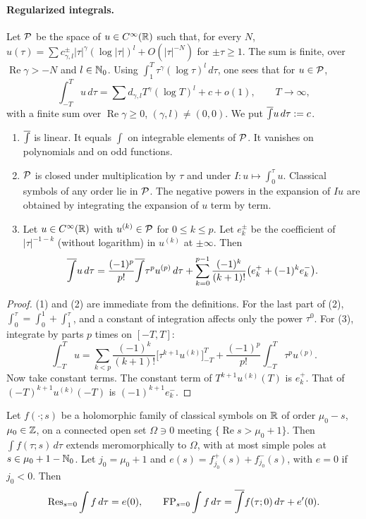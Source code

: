 \paragraph{Regularized integrals.}
Let \(\mathcal P\) be the space of \(u\in C^\infty(\mathbb R)\) such that, for every \(N\),
\(u(\tau)=\sum c^\pm_{\gamma,l}|\tau|^\gamma(\log|\tau|)^l+O(|\tau|^{-N})\)
for \(\pm\tau\ge1\). The sum is finite, over \(\operatorname{Re}\gamma>-N\)
and \(l\in\mathbb N_0\). Using \(\int_1^T\tau^\gamma(\log\tau)^l\,d\tau\), one sees
that for \(u\in\mathcal P\),
\[
 \int_{-T}^Tu\,d\tau=\sum d_{\gamma,l}T^\gamma(\log T)^l+c+o(1),\qquad
 T\to\infty,
\]
with a finite sum over \(\operatorname{Re}\gamma\ge0\), \((\gamma,l)\ne(0,0)\).
We put \(\overline{\int} u\,d\tau:=c\).

\begin{lemma}\label{tr:lem:bint}
\begin{enumerate}
\item \(\overline{\int}\) is linear. It equals \(\int\) on integrable elements of
\(\mathcal P\). It vanishes on polynomials and on odd functions.
\item \(\mathcal P\) is closed under multiplication by \(\tau\) and under
\(I:u\mapsto\int_0^\tau u\). Classical symbols of any order lie in
\(\mathcal P\). The negative powers in the expansion of \(Iu\) are obtained by
integrating the expansion of \(u\) term by term.
\item Let \(u\in C^\infty(\mathbb R)\) with \(u^{(k)}\in\mathcal P\) for \(0\le k\le p\). Let
\(e^\pm_k\) be the coefficient of \(|\tau|^{-1-k}\) (without logarithm) in
\(u^{(k)}\) at \(\pm\infty\). Then
\[
 \overline{\int} u\,d\tau=\frac{(-1)^p}{p!}\overline{\int}\tau^pu^{(p)}\,d\tau+
 \sum_{k=0}^{p-1}\frac{(-1)^k}{(k+1)!}\bigl(e^+_k+(-1)^ke^-_k\bigr).
\]
\end{enumerate}
\end{lemma}

\begin{proof}
(1) and (2) are immediate from the definitions. For the last part of (2),
\(\int_0^\tau=\int_0^1+\int_1^\tau\), and a constant of integration affects
only the power \(\tau^0\). For (3), integrate by parts \(p\) times on
\([-T,T]\):
\[
 \int_{-T}^Tu=\sum_{k<p}\frac{(-1)^k}{(k+1)!}\bigl[\tau^{k+1}u^{(k)}\bigr]_{-T}^T
 +\frac{(-1)^p}{p!}\int_{-T}^T\tau^pu^{(p)} .
\]
Now take constant terms. The constant term of \(T^{k+1}u^{(k)}(T)\) is
\(e^+_k\). That of \((-T)^{k+1}u^{(k)}(-T)\) is \((-1)^{k+1}e^-_k\).
\end{proof}

\begin{lemma}\label{tr:lem:FP}
Let \(f(\cdot;s)\) be a holomorphic family of classical symbols on \(\mathbb R\) of
order \(\mu_0-s\), \(\mu_0\in\mathbb Z\), on a connected open set \(\Omega\ni0\)
meeting \(\{\operatorname{Re}s>\mu_0+1\}\). Then \(\int f(\tau;s)\,d\tau\)
extends meromorphically to \(\Omega\), with at most simple poles at
\(s\in\mu_0+1-\mathbb N_0\). Let \(j_0=\mu_0+1\) and
\(e(s)=f^+_{j_0}(s)+f^-_{j_0}(s)\), with \(e=0\) if \(j_0<0\). Then
\[
 \operatorname{Res}_{s=0}\int f\,d\tau=e(0),\qquad
 \operatorname{FP}_{s=0}\int f\,d\tau=\overline{\int} f(\tau;0)\,d\tau+e'(0).
\]
\end{lemma}

